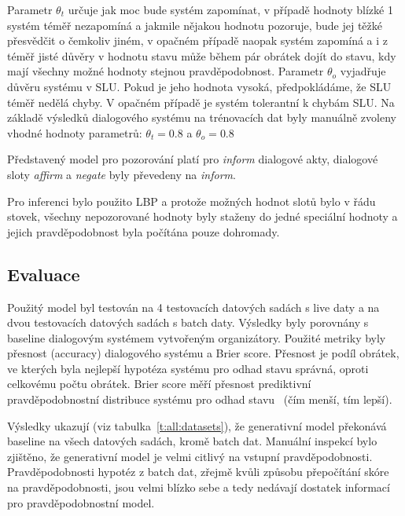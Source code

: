 Parametr $\theta_t$ určuje jak moc bude systém zapomínat, v případě hodnoty blízké 1 systém téměř nezapomíná a jakmile nějakou hodnotu pozoruje, bude jej těžké přesvědčit o čemkoliv jiném, v opačném případě naopak systém zapomíná a i z téměř jisté důvěry v hodnotu stavu může během pár obrátek dojít do stavu, kdy mají všechny možné hodnoty stejnou pravděpodobnost.
Parametr $\theta_o$ vyjadřuje důvěru systému v SLU.
Pokud je jeho hodnota vysoká, předpokládáme, že SLU téměř nedělá chyby.
V opačném případě je systém tolerantní k chybám SLU.
Na základě výsledků dialogového systému na trénovacích dat byly manuálně zvoleny vhodné hodnoty parametrů: $\theta_t = 0.8$ a $\theta_o = 0.8$

Představený model pro pozorování platí pro \emph{inform} dialogové akty, dialogové sloty \emph{affirm} a \emph{negate} byly převedeny na \emph{inform}.

Pro inferenci bylo použito LBP a protože možných hodnot slotů bylo v řádu stovek, všechny nepozorované hodnoty byly staženy do jedné speciální hodnoty a jejich pravděpodobnost byla počítána pouze dohromady.

\subsection{Evaluace}

Použitý model byl testován na 4 testovacích datových sadách s live daty a na dvou testovacích datových sadách s batch daty.
Výsledky byly porovnány s baseline dialogovým systémem vytvořeným organizátory.
Použité metriky byly přesnost (accuracy) dialogového systému a Brier score.
Přesnost je podíl obrátek, ve kterých byla nejlepší hypotéza systému pro odhad stavu správná, oproti celkovému počtu obrátek.
Brier score měří přesnost prediktivní pravděpodobnostní distribuce systému pro odhad stavu~\cite{brier1950verification} (čím menší, tím lepší).

Výsledky ukazují (viz tabulka~\ref{t:all:datasets}), že generativní model překonává baseline na všech datových sadách, kromě batch dat.
Manuální inspekcí bylo zjištěno, že generativní model je velmi citlivý na vstupní pravděpodobnosti.
Pravděpodobnosti hypotéz z batch dat, zřejmě kvůli způsobu přepočítání skóre na pravděpodobnosti, jsou velmi blízko sebe a tedy nedávají dostatek informací pro pravděpodobnostní model.

